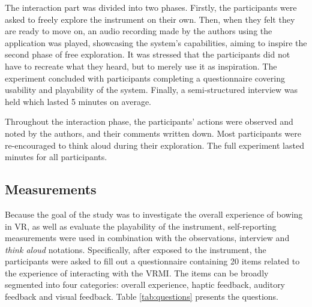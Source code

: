 \documentclass[dvipsnames, pdftex]{article}
\begin{document}
The interaction part was divided into two phases. Firstly, the participants were asked to freely explore the instrument on their own. Then, when they felt they are ready to move on, an audio recording made by the authors using the application was played, showcasing the system's capabilities, aiming to inspire the second phase of free exploration. It was stressed that the participants did not have to recreate what they heard, but to merely use it as inspiration. The experiment concluded with participants completing a questionnaire covering usability and playability of the system. Finally, a semi-structured interview was held which lasted 5 minutes on average. 

Throughout the interaction phase, the participants' actions were observed and noted by the authors, and their comments written down. Most participants were re-encouraged to think aloud during their exploration. The full experiment lasted  minutes for all participants.
\subsection{Measurements}

Because the  goal of the study was to investigate the overall experience of bowing in VR, as well as evaluate the playability of the instrument,  self-reporting measurements were used in combination with the observations, interview and \textit{think aloud} notations. Specifically, after exposed to the instrument, the participants were asked to fill out a questionnaire containing 20 items related to the experience of interacting with the VRMI. The items can be broadly segmented into four categories: overall experience, haptic feedback, auditory feedback and visual feedback. Table \ref{tab:questions} presents the questions.
\end{document}
